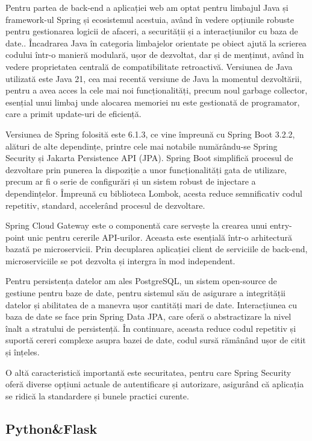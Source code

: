 Pentru partea de back-end a aplicației web am optat pentru limbajul Java și framework-ul Spring și ecosistemul acestuia, având în vedere opțiunile robuste pentru gestionarea logicii de afaceri, a securității și a interacțiunilor cu baza de date.\cite{why-spring}. Încadrarea Java în categoria limbajelor orientate pe obiect ajută la scrierea codului într-o manieră modulară, ușor de dezvoltat, dar și de menținut, având în vedere proprietatea centrală de compatibilitate retroactivă. Versiunea de Java utilizată este Java 21, cea mai recentă versiune de Java la momentul dezvoltării, pentru a avea acces la cele mai noi funcționalități,  precum noul garbage collector, esențial unui limbaj unde alocarea memoriei nu este gestionată de programator, care a primit update-uri de eficiență.

Versiunea de Spring folosită este 6.1.3, ce vine împreună cu Spring Boot 3.2.2, alături de alte dependințe, printre cele mai notabile numărându-se Spring Security și Jakarta Persistence API (JPA). Spring Boot simplifică procesul de dezvoltare prin punerea la dispoziție a unor funcționalități gata de utilizare, precum ar fi o serie de configurări și un sistem robust de injectare a dependințelor. Împreună cu biblioteca Lombok, acesta reduce semnificativ codul repetitiv, standard, accelerând procesul de dezvoltare.

Spring Cloud Gateway este o componentă care servește la crearea unui entry-point unic pentru cererile API-urilor. Aceasta este esențială într-o arhitectură bazată pe microservicii. Prin decuplarea aplicației client de serviciile de back-end, microserviciile se pot dezvolta și intergra în mod independent.

Pentru persistența datelor am ales PostgreSQL, un sistem open-source de gestiune pentru baze de date, pentru sistemul său de asigurare a integrității datelor și abilitatea de a manevra ușor cantități mari de date. Interacțiunea cu baza de date se face prin Spring Data JPA, care oferă o abstractizare la nivel înalt a stratului de persistență. În continuare, aceasta reduce codul repetitiv și suportă cereri complexe asupra bazei de date, codul sursă rămânând ușor de citit și înțeles.

O altă caracteristică importantă este securitatea, pentru care Spring Security oferă diverse opțiuni actuale de autentificare și autorizare, asigurând că aplicația se ridică la standardere și bunele practici curente.

\subsection{Python\&Flask}

